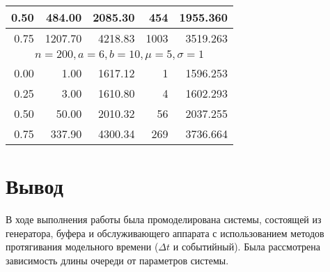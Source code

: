 \begin{threeparttable}[]
\begin{tabular}{|rrrrr|}
\multicolumn{1}{|r|}{0.50}                                                                                   & \multicolumn{1}{r|}{484.00}         & \multicolumn{1}{r|}{2085.30}                                                       & \multicolumn{1}{r|}{454}            & 1955.360                                                                           \\ \hline
\multicolumn{1}{|r|}{0.75}                                                                                   & \multicolumn{1}{r|}{1207.70}        & \multicolumn{1}{r|}{4218.83}                                                       & \multicolumn{1}{r|}{1003}           & 3519.263                                                                           \\ \hline
\multicolumn{5}{|c|}{$n = 200, a = 6, b = 10, \mu = 5, \sigma = 1$}                                                                                                                                                                                                                                                                                                \\ \hline
\multicolumn{1}{|r|}{0.00}                                                                                   & \multicolumn{1}{r|}{1.00}           & \multicolumn{1}{r|}{1617.12}                                                       & \multicolumn{1}{r|}{1}              & 1596.253                                                                           \\ \hline
\multicolumn{1}{|r|}{0.25}                                                                                   & \multicolumn{1}{r|}{3.00}           & \multicolumn{1}{r|}{1610.80}                                                       & \multicolumn{1}{r|}{4}              & 1602.293                                                                           \\ \hline
\multicolumn{1}{|r|}{0.50}                                                                                   & \multicolumn{1}{r|}{50.00}          & \multicolumn{1}{r|}{2010.32}                                                       & \multicolumn{1}{r|}{56}             & 2037.255                                                                           \\ \hline
\multicolumn{1}{|r|}{0.75}                                                                                   & \multicolumn{1}{r|}{337.90}         & \multicolumn{1}{r|}{4300.34}                                                       & \multicolumn{1}{r|}{269}            & 3736.664                                                                           \\ \hline
\end{tabular}
\end{threeparttable}

\clearpage

\section*{Вывод}

В ходе выполнения работы была промоделирована системы, состоящей из генератора,
буфера и обслуживающего аппарата с использованием методов протягивания
модельного времени ($\Delta t$ и событийный). Была рассмотрена зависимость длины
очереди от параметров системы.

